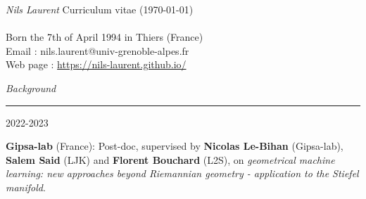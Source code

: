 \documentclass[a4paper,10pt]{article}
\begin{document}
	\noindent
	\textit{\Large \color{Black} Nils Laurent} \hfill {Curriculum vitae (\today)}\\
	\vspace{0mm}\\
	Born the 7th of April 1994 in Thiers (France)\\
	Email : nils.laurent@univ-grenoble-alpes.fr\\
	Web page : \url{https://nils-laurent.github.io/}\\
	\vspace{5mm}
	
	\noindent
	\textit{\Large \color{MyGray} \hspace{5mm} Background}
	\vspace{2mm}
	{\color{DefaultGray}\hrule height .1pt}
	\vspace{4mm}
	
	\noindent
	\begin{minipage}{0.20\textwidth}
		\color{MyGray} 2022-2023
	\end{minipage}
	\hfill
	\begin{minipage}{0.70\textwidth}
		\textbf{Gipsa-lab} (France): Post-doc, supervised by \textbf{Nicolas Le-Bihan} (Gipsa-lab), \textbf{Salem Said} (LJK) and \textbf{Florent Bouchard} (L2S), on \emph{geometrical machine learning: new approaches beyond Riemannian geometry - application to the Stiefel manifold}.
	\end{minipage}\\
	\vspace{2mm}
	
\end{document}
